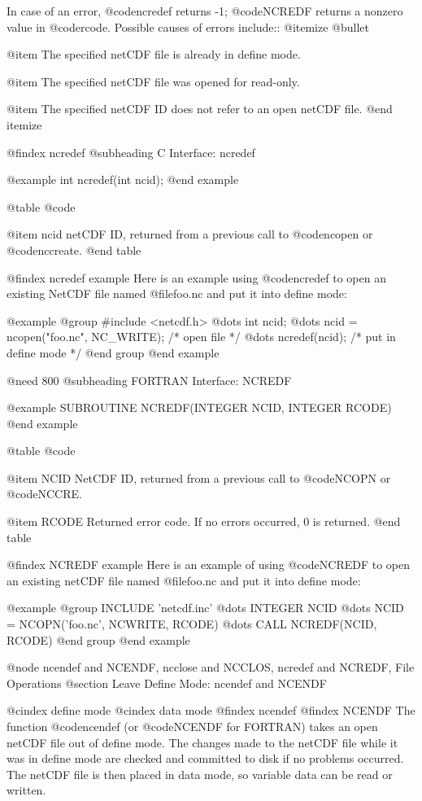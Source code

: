 In case of an error, @code{ncredef} returns -1; @code{NCREDF} returns a
nonzero value in @code{rcode}.  Possible causes of errors include::
@itemize @bullet

@item
The specified netCDF file is already in define mode.

@item
The specified netCDF file was opened for read-only.

@item
The specified netCDF ID does not refer to an open netCDF file.
@end itemize

@findex ncredef
@subheading C Interface:  ncredef

@example
int ncredef(int ncid);
@end example

@table @code

@item ncid
netCDF ID, returned from a previous call to @code{ncopen} or @code{nccreate}.
@end table

@findex ncredef example
Here is an example using @code{ncredef} to open an existing NetCDF file
named @file{foo.nc} and put it into define mode:

@example
@group
#include <netcdf.h>
   @dots{}
int ncid;
   @dots{}
ncid = ncopen("foo.nc", NC_WRITE);    /* open file */
   @dots{}
ncredef(ncid);                        /* put in define mode */
@end group
@end example

@need 800
@subheading FORTRAN Interface:  NCREDF

@example
SUBROUTINE NCREDF(INTEGER NCID, INTEGER RCODE)
@end example

@table @code

@item NCID
NetCDF ID, returned from a previous call to @code{NCOPN} or @code{NCCRE}.

@item RCODE
Returned error code.  If no errors occurred, 0 is returned.
@end table

@findex NCREDF example
Here is an example of using @code{NCREDF} to open an existing netCDF file
named @file{foo.nc} and put it into define mode:

@example
@group
      INCLUDE 'netcdf.inc'
         @dots{}
      INTEGER NCID
         @dots{}
      NCID = NCOPN('foo.nc', NCWRITE, RCODE)
         @dots{}
      CALL NCREDF(NCID, RCODE)
@end group
@end example

@node ncendef and NCENDF, ncclose and NCCLOS, ncredef and NCREDF, File Operations
@section Leave Define Mode:  ncendef and NCENDF

@cindex define mode
@cindex data mode
@findex ncendef
@findex NCENDF
The function @code{ncendef} (or @code{NCENDF} for FORTRAN) takes an open
netCDF file out of define mode.  The changes made to the netCDF file
while it was in define mode are checked and committed to disk if no
problems occurred.  The netCDF file is then placed in data mode, so
variable data can be read or written.

